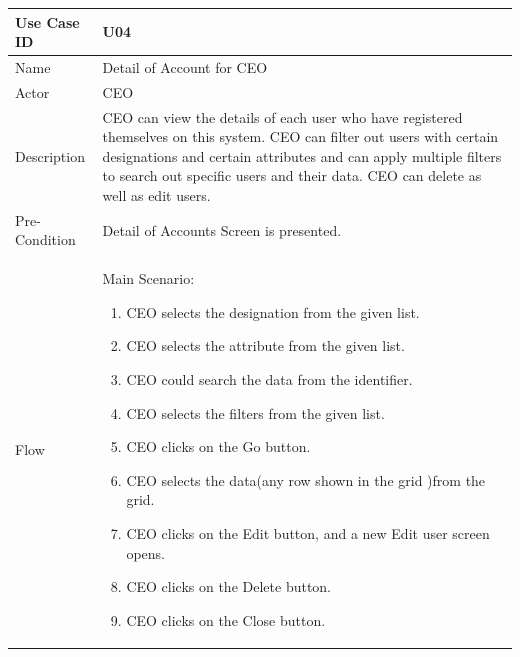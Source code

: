 \documentclass[12pt,a4paper]{report}
\begin{document}
\begin{tabular}{ | m{3cm} | m{12cm}| } \hline

Use Case ID & U04  \\\hline

Name  	    & Detail of Account for CEO  \\ \hline

Actor     	& CEO\\ \hline

Description &  CEO can view the details of each user who have registered themselves on this system. CEO can filter out users with certain designations and certain attributes and can apply multiple filters to search out specific users and  their data. CEO can delete as well as edit users.\\ \hline

Pre-Condition &  Detail of Accounts Screen is presented. \\ \hline

Flow       & Main Scenario:

\begin{enumerate}
\item  CEO selects the designation from the given list.
\item  CEO selects the attribute from the given list. 
\item  CEO could search the data from the identifier.
\item  CEO selects the filters from the given list.
\item  CEO clicks on the Go button.
\item  CEO selects the data(any row shown in the grid )from the grid. 
\item  CEO clicks on the Edit button, and a new Edit user screen opens.
\item  CEO clicks on the Delete button.
\item  CEO clicks on the Close button.


\end{enumerate}\\ \hline
\end{tabular}
\end{document}
